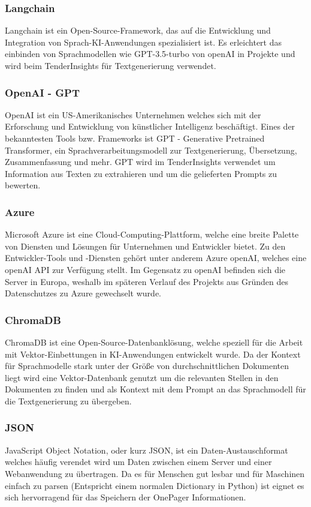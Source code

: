 \subsubsection{Langchain}
Langchain ist ein Open-Source-Framework, das auf die Entwicklung und Integration von Sprach-KI-Anwendungen spezialisiert
ist. Es erleichtert das einbinden von Sprachmodellen wie GPT-3.5-turbo von openAI in Projekte und wird beim
TenderInsights für Textgenerierung verwendet.

\subsubsection{OpenAI - GPT}
OpenAI ist ein US-Amerikanisches Unternehmen welches sich mit der Erforschung und Entwicklung von künstlicher
Intelligenz beschäftigt. Eines der bekanntesten Tools bzw. Frameworks ist GPT - Generative Pretrained Transformer, ein
Sprachverarbeitungsmodell zur Textgenerierung, Übersetzung, Zusammenfassung und mehr. GPT wird im TenderInsights
verwendet um Information aus Texten zu extrahieren und um die gelieferten Prompts zu bewerten.

\subsubsection{Azure}
Microsoft Azure ist eine Cloud-Computing-Plattform, welche eine breite Palette von Diensten und Lösungen für Unternehmen
und Entwickler bietet. Zu den Entwickler-Tools und -Diensten gehört unter anderem Azure openAI, welches eine openAI API
zur Verfügung stellt. Im Gegensatz zu openAI befinden sich die Server in Europa, weshalb im späteren Verlauf des
Projekts aus Gründen des Datenschutzes zu Azure gewechselt wurde.

\subsubsection{ChromaDB}
ChromaDB ist eine Open-Source-Datenbanklösung, welche speziell für die Arbeit mit Vektor-Einbettungen in KI-Anwendungen
entwickelt wurde. Da der Kontext für Sprachmodelle stark unter der Größe von durchschnittlichen Dokumenten liegt wird
eine Vektor-Datenbank genutzt um die relevanten Stellen in den Dokumenten zu finden und als Kontext mit dem Prompt an
das Sprachmodell für die Textgenerierung zu übergeben.

\subsubsection{JSON}
JavaScript Object Notation, oder kurz JSON, ist ein Daten-Austauschformat welches häufig verendet wird um Daten zwischen
einem Server und einer Webanwendung zu übertragen. Da es für Menschen gut lesbar und für Maschinen einfach zu parsen
(Entspricht einem normalen Dictionary in Python) ist eignet es sich hervorragend für das Speichern der OnePager
Informationen.

